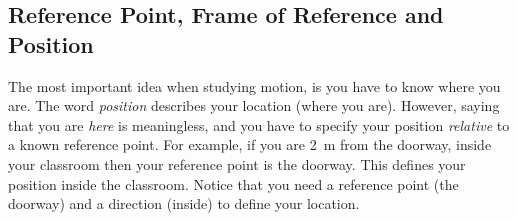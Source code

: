             \subsection{ Reference Point, Frame of Reference and Position}
            \nopagebreak
      \label{m38787*id62597}The most important idea when studying motion, is you have to know where you are. The word \textsl{position} describes your location (where you are). However, saying that you are \textsl{here} is meaningless, and you have to specify your position \textsl{relative} to a known reference point. For example, if you are 2~m from the doorway, inside your classroom then your reference point is the doorway. This defines your position inside the classroom. Notice that you need a reference point (the doorway) and a direction (inside) to define your location.\par 
      \label{m38787*uid4}
